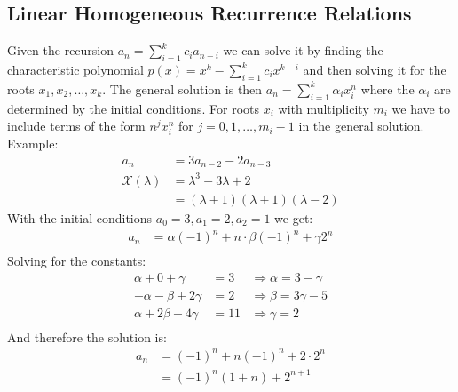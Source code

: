 \subsection{Linear Homogeneous Recurrence Relations}
Given the recursion \( a_n = \sum_{i=1}^{k} c_i a_{n-i} \) we can solve it by finding the characteristic polynomial \( p(x) = x^k - \sum_{i=1}^{k} c_i x^{k-i} \) and then solving it for the roots \( x_1, x_2, \ldots, x_k \). The general solution is then \( a_n = \sum_{i=1}^{k} \alpha_i x_i^n \) where the \( \alpha_i \) are determined by the initial conditions.
For roots \( x_i \) with multiplicity \( m_i \) we have to include terms of the form \( n^j x_i^n \) for \( j = 0, 1, \ldots, m_i - 1 \) in the general solution.
Example:
\begin{align*}
    a_n &= 3 a_{n-2} - 2 a_{n-3} \\
    \mathcal{X}(\lambda) &= \lambda^3 - 3 \lambda + 2 \\
    &= (\lambda + 1)(\lambda + 1)(\lambda - 2) 
\end{align*}
With the initial conditions \( a_0 = 3, a_1 = 2, a_2 = 1 \) we get:
\begin{align*}
    a_n &= \alpha \left( -1 \right)^{n} + n \cdot \beta \left( -1 \right)^{n} + \gamma 2^{n} \\
\end{align*}
Solving for the constants:
\begin{align*}
     \alpha + 0 + \gamma &= 3 &\Rightarrow \alpha = 3 - \gamma \\
     -\alpha - \beta + 2 \gamma &= 2 &\Rightarrow \beta = 3 \gamma - 5 \\
     \alpha + 2 \beta + 4 \gamma &= 11 &\Rightarrow \gamma = 2 \\
\end{align*}
And therefore the solution is:
\begin{align*}
    a_n &= \left( -1 \right)^{n} + n \left( -1 \right)^{n} + 2 \cdot 2^n \\
    &= \left( -1 \right)^{n} \left( 1 + n \right) + 2^{n+1}
\end{align*}


